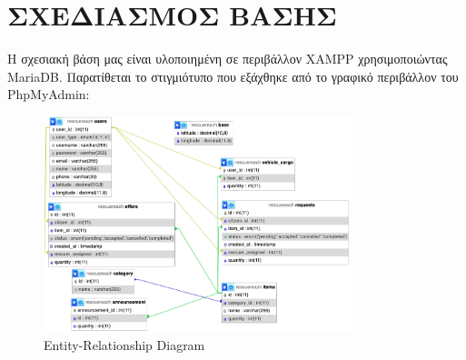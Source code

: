 \chapter{ΣΧΕΔΙΑΣΜΟΣ ΒΑΣΗΣ}
    Η σχεσιακή βάση μας είναι υλοποιημένη σε περιβάλλον XAMPP χρησιμοποιώντας MariaDB.
    Παρατίθεται το στιγμιότυπο που εξάχθηκε από το γραφικό περιβάλλον του PhpMyAdmin:

    \begin{figure}[h!] \noindent \centering
        \includegraphics[width=0.8\textwidth]{img/sxesiakivash}
        \caption{Entity-Relationship Diagram}
    \end{figure}
